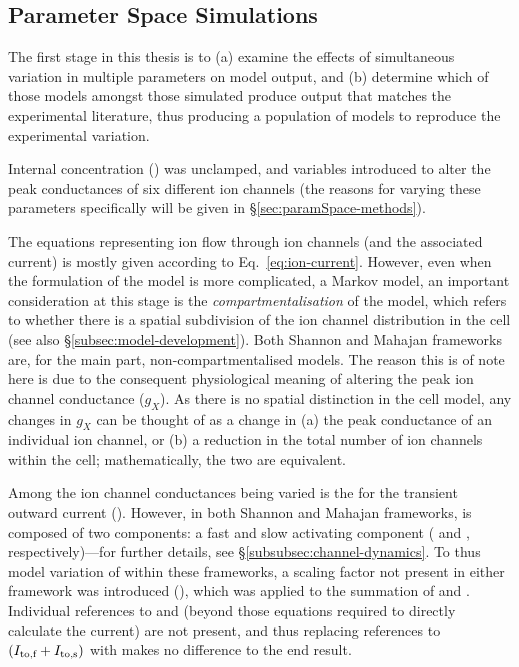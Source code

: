 \documentclass[../thesis-main.tex]{subfiles}
\begin{document}
\subsection{Parameter Space Simulations}
\label{subsec:paramSpace-simulation}
The first stage in this thesis is to (a) examine the effects of simultaneous variation in multiple parameters on model output, and (b) determine which of those models amongst those simulated produce output that matches the experimental literature, thus producing a population of models to reproduce the experimental variation.

Internal \K{} concentration (\ki{}) was unclamped, and variables introduced to alter the peak conductances of six different ion channels (the reasons for varying these parameters specifically will be given in \S\ref{sec:paramSpace-methods}).

The equations representing ion flow through ion channels (and the associated current) is mostly given according to Eq.~\eqref{eq:ion-current}. However, even when the formulation of the model is more complicated, \eg{} a Markov model, an important consideration at this stage is the \emph{compartmentalisation} of the model, which refers to whether there is a spatial subdivision of the ion channel distribution in the cell (see also \S\ref{subsec:model-development}). Both Shannon and Mahajan frameworks are, for the main part, non-compartmentalised models. The reason this is of note here is due to the consequent physiological meaning of altering the peak ion channel conductance ($g_X$). As there is no spatial distinction in the cell model, any changes in $g_X$ can be thought of as a change in (a) the peak conductance of an individual ion channel, or (b) a reduction in the total number of ion channels within the cell; mathematically, the two are equivalent.

Among the ion channel conductances being varied is the for the transient outward current (\ito{}). However, in both Shannon and Mahajan frameworks, \ito{} is composed of two components: a fast and slow activating component (\itof{} and \itos{}, respectively)---for further details, see \S\ref{subsubsec:channel-dynamics}. To thus model variation of \ito{} within these frameworks, a scaling factor not present in either framework was introduced (\gto{}), which was applied to the summation of \itof{} and \itos{}. Individual references to \itof{} and \itos{} (beyond those equations required to directly calculate the current) are not present, and thus replacing references to $(I_\textnormal{to,f}+I_\textnormal{to,s})$ with \ito{} makes no difference to the end result.
\end{document}
